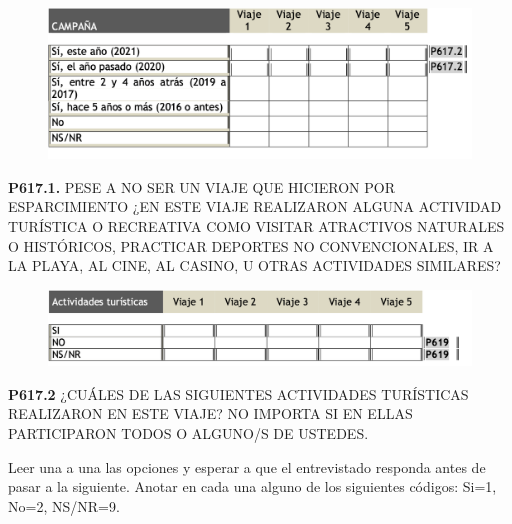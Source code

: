 \documentclass[
  openany]{book}
\begin{document}
\begin{figure}

{\centering \includegraphics[width=1\linewidth]{imagenes/figura6-225} 

}

\end{figure}

\textbf{P617.1.} PESE A NO SER UN VIAJE QUE HICIERON POR ESPARCIMIENTO ¿EN ESTE VIAJE REALIZARON ALGUNA ACTIVIDAD TURÍSTICA O RECREATIVA COMO VISITAR ATRACTIVOS NATURALES O HISTÓRICOS, PRACTICAR DEPORTES NO CONVENCIONALES, IR A LA PLAYA, AL CINE, AL CASINO, U OTRAS ACTIVIDADES SIMILARES?

\begin{figure}

{\centering \includegraphics[width=1\linewidth]{imagenes/figura6-226} 

}

\end{figure}

\textbf{P617.2} ¿CUÁLES DE LAS SIGUIENTES ACTIVIDADES TURÍSTICAS REALIZARON EN ESTE VIAJE? NO IMPORTA SI EN ELLAS PARTICIPARON TODOS O ALGUNO/S DE USTEDES.

Leer una a una las opciones y esperar a que el entrevistado responda antes de pasar a la siguiente. Anotar en cada una alguno de los siguientes códigos: Si=1, No=2, NS/NR=9.
\end{document}
